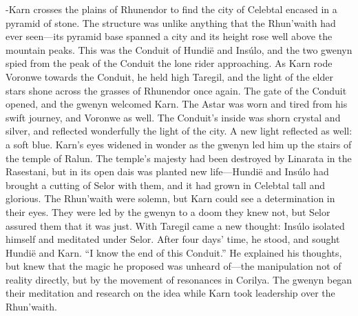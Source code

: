 \documentclass[smalldemyvopaper,11pt,twoside,onecolumn,openright,extrafontsizes]{memoir}
\begin{document}
-Karn crosses the plains of Rhunendor to find the city of Celebtal encased in a pyramid of stone. The structure was unlike anything that the Rhun’waith had ever seen—its pyramid base spanned a city and its height rose well above the mountain peaks. This was the Conduit of Hundië and Insúlo, and the two gwenyn spied from the peak of the Conduit the lone rider approaching. As Karn rode Voronwe towards the Conduit, he held high Taregil, and the light of the elder stars shone across the grasses of Rhunendor once again. The gate of the Conduit opened, and the gwenyn welcomed Karn. The Astar was worn and tired from his swift journey, and Voronwe as well. The Conduit’s inside was shorn crystal and silver, and reflected wonderfully the light of the city. A new light reflected as well: a soft blue. Karn’s eyes widened in wonder as the gwenyn led him up the stairs of the temple of Ralun. The temple’s majesty had been destroyed by Linarata in the Rasestani, but in its open dais was planted new life—Hundië and Insúlo had brought a cutting of Selor with them, and it had grown in Celebtal tall and glorious. The Rhun’waith were solemn, but Karn could see a determination in their eyes. They were led by the gwenyn to a doom they knew not, but Selor assured them that it was just.
	With Taregil came a new thought: Insúlo isolated himself and meditated under Selor. After four days’ time, he stood, and sought Hundië and Karn.
“I know the end of this Conduit.”
	He explained his thoughts, but knew that the magic he proposed was unheard of—the manipulation not of reality directly, but by the movement of resonances in Corilya. The gwenyn began their meditation and research on the idea while Karn took leadership over the Rhun’waith.
\end{document}
